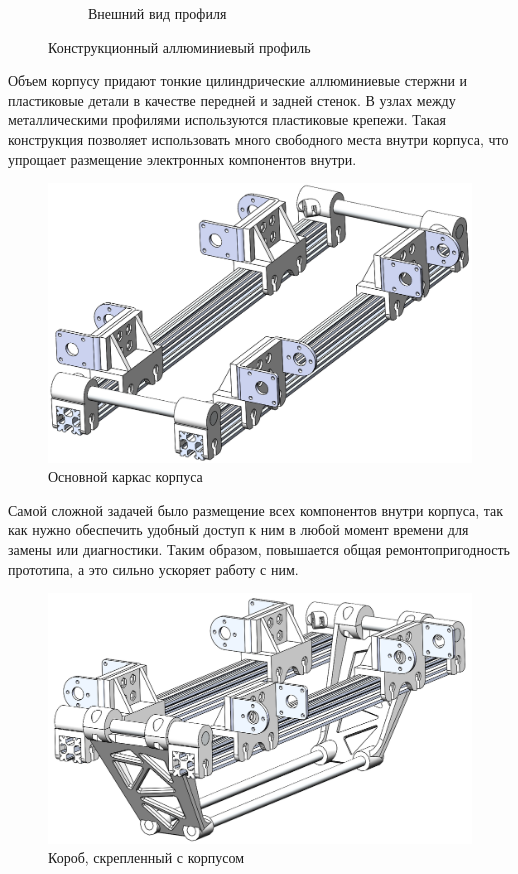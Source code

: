 \begin{figure}[ht]
\begin{subfigure}[b]{0.45\textwidth}
        \caption{Внешний вид профиля}
    \end{subfigure}
     
    \caption{Конструкционный аллюминиевый профиль}
    \label{}
\end{figure}

Объем корпусу придают тонкие цилиндрические аллюминиевые стержни и пластиковые детали в качестве передней и задней стенок. В узлах между металлическими профилями используются пластиковые крепежи. Такая конструкция позволяет использовать много свободного места внутри корпуса, что упрощает размещение электронных компонентов внутри.

\begin{figure}[h]
    \centering
    \includegraphics[scale=0.55]{chapter_mechanics_construction/figure10.png}
    \caption{Основной каркас корпуса}
    \label{}
\end{figure}

\newpage
Самой сложной задачей было размещение всех компонентов внутри корпуса, так как нужно обеспечить удобный доступ к ним в любой момент времени для замены или диагностики. Таким образом, повышается общая ремонтопригодность прототипа, а это сильно ускоряет работу с ним.

\begin{figure}[h]
    \centering
    \includegraphics[scale=0.57]{chapter_mechanics_construction/figure13.png}
    \caption{Короб, скрепленный с корпусом}
    \label{}
\end{figure}

